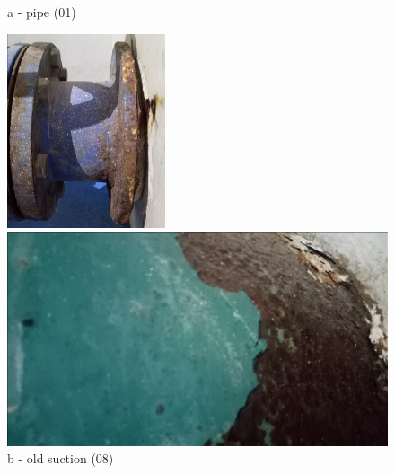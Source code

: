 \begin{figure}[!htb]
\begin{minipage}[b]{0.15\linewidth}
		\caption*{a - pipe (01)}
		\label{ch043_discharge_pipe_deteriorationA}
	\end{minipage}
	\hspace{0.05cm}
	\begin{minipage}[b]{0.2\linewidth}
		\centering
		\includegraphics[width=\textwidth]{figures/ch043_old_suction_pipeB}
		\caption*{b - old suction (08)}
		\label{ch043_discharge_pipe_deteriorationB}
	\end{minipage}
	\hspace{0.05cm}
	\begin{minipage}[b]{0.2\linewidth}
		\centering
		\includegraphics[width=\textwidth]{figures/ch043_discharge_pipe_deteriorationC}

\end{minipage}
\end{figure}

